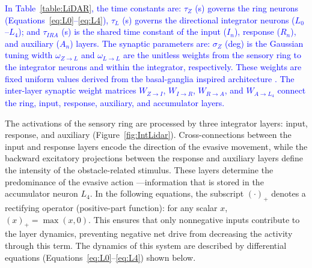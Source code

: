 \documentclass[preprint,12pt]{elsarticle}
\newcommand{\revblue}[1]{\textcolor{blue}{#1}}
\begin{document}
\revblue{In Table~\ref{table:LiDAR}, the time constants are: $\tau_{Z}$ (s) governs the ring neurons (Equations~\eqref{eq:L0}–\eqref{eq:L4}), $\tau_{L}$ (s) governs the directional integrator neurons ($L_0$–$L_4$); and $\tau_{IRA}$ (s) is the shared time constant of the input ($I_n$), response ($R_n$), and auxiliary ($A_n$) layers.
The synaptic parameters are: $\sigma_{Z}$ (deg) is the Gaussian tuning width $\omega_{Z\rightarrow L}$ and $\omega_{L\rightarrow L}$ are the unitless weights from the sensory ring to the integrator neurons and within the integrator, respectively. These weights are fixed uniform values derived from the basal-ganglia inspired architecture \citep{sarvestani2013computational}.
The inter-layer synaptic weight matrices $W_{Z\rightarrow I}$, $W_{I\rightarrow R}$, $W_{R\rightarrow A}$, and $W_{A\rightarrow L_4}$ connect the ring, input, response, auxiliary, and accumulator layers.}

The activations of the sensory ring are processed by three integrator layers: input, response, and auxiliary (Figure~\ref{fig:IntLidar}). Cross-connections between the input and response layers encode the direction of the evasive movement, while the backward excitatory projections between the response and auxiliary layers define the intensity of the obstacle-related stimulus. These layers determine the predominance of the evasive action ---information that is stored in the accumulator neuron $L_4$. In the following equations, the subscript $(\cdot)_+$ denotes a rectifying operator (positive-part function): for any scalar $x$, $(x)_+ = \max(x,0)$. This ensures that only nonnegative inputs contribute to the layer dynamics, preventing negative net drive from decreasing the activity through this term. The dynamics of this system are described by differential equations (Equations~\eqref{eq:L0}–\eqref{eq:L4}) shown below. 
\end{document}
